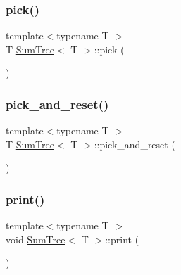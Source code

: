 \mbox{\label{class_sum_tree_a464dc3f669bb2767932bb7bf6f487182}} 
\subsubsection{\texorpdfstring{pick()}{pick()}}
{\footnotesize\ttfamily template$<$typename T $>$ \\
T \hyperlink{class_sum_tree}{Sum\+Tree}$<$ T $>$\+::pick (\begin{DoxyParamCaption}{ }\end{DoxyParamCaption})}

\mbox{\label{class_sum_tree_a038d15796c15a891f9886f0fdb4ea7b7}} 
\subsubsection{\texorpdfstring{pick\+\_\+and\+\_\+reset()}{pick\_and\_reset()}}
{\footnotesize\ttfamily template$<$typename T $>$ \\
T \hyperlink{class_sum_tree}{Sum\+Tree}$<$ T $>$\+::pick\+\_\+and\+\_\+reset (\begin{DoxyParamCaption}{ }\end{DoxyParamCaption})}

\mbox{\label{class_sum_tree_a62581874cf74bce8b458428e28b89947}} 
\subsubsection{\texorpdfstring{print()}{print()}}
{\footnotesize\ttfamily template$<$typename T $>$ \\
void \hyperlink{class_sum_tree}{Sum\+Tree}$<$ T $>$\+::print (\begin{DoxyParamCaption}{ }\end{DoxyParamCaption})}

\mbox{\label{class_sum_tree_aa25dae8e741a901135afcdc4ac296895}} 

